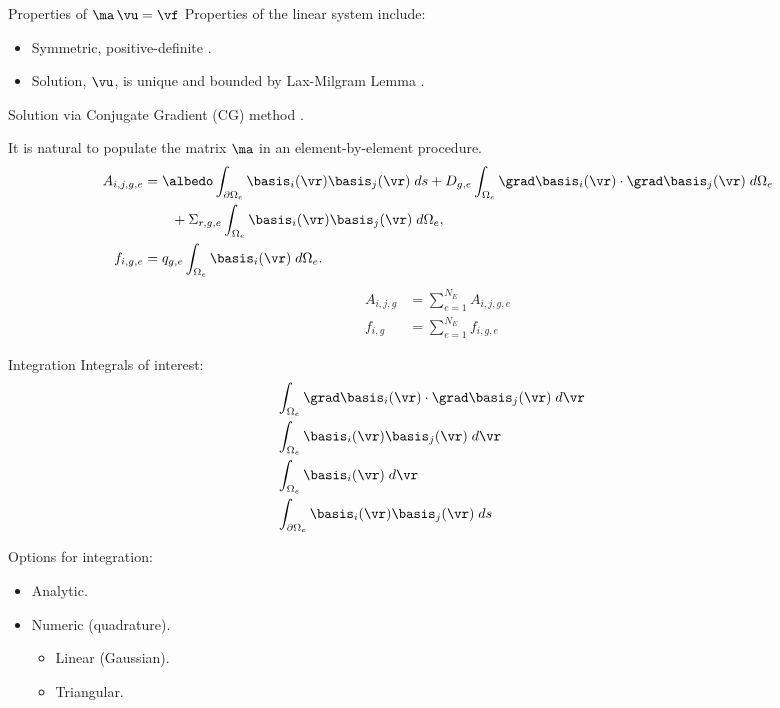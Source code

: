 \begin{frame}{Properties of $\ma \, \vu = \vf$}
  Properties of the linear system include:
  \begin{itemize}
    \item Symmetric, positive-definite \cite{textbookhughes}.
    \item Solution, $\vu$, is unique and bounded by Lax-Milgram Lemma 
      \cite{textbookli}.
  \end{itemize}
  Solution via Conjugate Gradient (CG) method 
  \cite{Kelley1995IterativeEquations}.

  It is natural to populate the matrix $\ma$ in an element-by-element procedure.
  \begin{align}
    \label{eq:matrix_population}
    A_{i,j,g,e} &= \albedo \int_{\partial \Omega_e} \basis_i(\vr) 
      \basis_j(\vr) \; ds + D_{g,e} 
      \int_{\Omega_e} \grad \basis_i(\vr) \cdot \grad \basis_j(\vr) \;
      d\Omega_e \\
    &\qquad + \Sigma_{r,g,e} \int_{\Omega_e} \basis_i(\vr) \basis_j(\vr)
      \; d\Omega_e, \\
    \label{eq:vector_population}
    f_{i,g,e} &= q_{g,e} \int_{\Omega_e} \basis_i(\vr) \;d\Omega_e.
  \end{align}
  \begin{align}
    A_{i,j,g} &= \sum_{e=1}^{N_E} A_{i,j,g,e} \\
    f_{i,g} &=  \sum_{e=1}^{N_E} f_{i,g,e}
  \end{align}
\end{frame}

\begin{frame}{Integration}
  Integrals of interest:
  \begin{align}
    &\int_{\Omega_e} \grad \basis_i(\vr) \cdot \grad \basis_j(\vr) 
      \;d\vr \\
    &\int_{\Omega_e} \basis_i(\vr) \basis_j(\vr) \;d\vr \\
    &\int_{\Omega_e} \basis_i(\vr) \;d\vr \\
    &\int_{\partial \Omega_e} \basis_i(\vr) \basis_j(\vr) \;ds &
  \end{align}

  Options for integration:
  \begin{itemize}
    \item Analytic.
    \item Numeric (quadrature).
    \begin{itemize}
      \item Linear (Gaussian).
      \item Triangular.
    \end{itemize}
  \end{itemize}
\end{frame}

